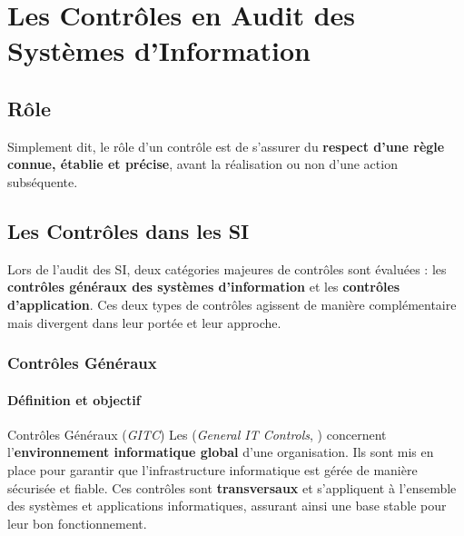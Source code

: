 \section{Les Contrôles en Audit des Systèmes d'Information}

\subsection{Rôle}

Simplement dit, le rôle d'un contrôle est de s'assurer du \textbf{respect d'une règle
connue, établie et précise}, avant la réalisation ou non d'une action subséquente.

\subsection{Les Contrôles dans les SI}

Lors de l'audit des SI, deux catégories majeures de contrôles sont évaluées :
les \textbf{contrôles généraux des systèmes d'information} et les
\textbf{contrôles d'application}. Ces deux types de contrôles agissent de manière
complémentaire mais divergent dans leur portée et leur approche.

\subsubsection{Contrôles Généraux}

\paragraph{Définition et objectif}

\begin{boxdef}{Contrôles Généraux (\textit{GITC})}
Les 
(\textit{General IT Controls}, ) concernent l'\textbf{environnement
informatique global} d'une organisation. Ils sont mis en place pour garantir que
l'infrastructure informatique est gérée de manière sécurisée et fiable. Ces contrôles
sont \textbf{transversaux} et s'appliquent à l'ensemble des systèmes et applications
informatiques, assurant ainsi une base stable pour leur bon fonctionnement.
\end{boxdef}

